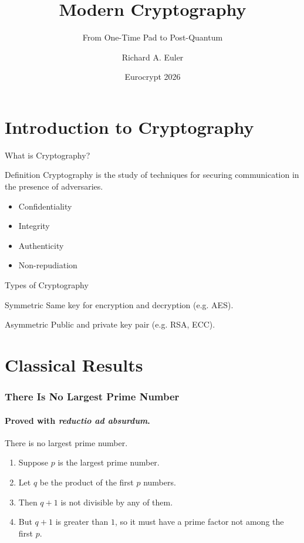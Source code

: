 \documentclass{beamer}
\title[Modern Cryptography]{Modern Cryptography}
\subtitle{From One-Time Pad to Post-Quantum}
\author[N. Surname]{Richard A. Euler}
\institute{Politecnico di Torino}
\date[EC26]{Eurocrypt 2026}
\begin{document}
\begin{frame}
  \titlepage
\end{frame}

\section{Introduction to Cryptography}

\begin{frame}{What is Cryptography?}
\begin{block}{Definition}
Cryptography is the study of techniques for securing communication in the presence of adversaries.
\end{block}

\begin{itemize}
\item<1-> Confidentiality
\item<2-> Integrity
\item<3-> Authenticity
\item<4-> Non-repudiation
\end{itemize}
\end{frame}

\begin{frame}{Types of Cryptography}
\begin{exampleblock}{Symmetric}
Same key for encryption and decryption (e.g. AES).
\end{exampleblock}

\begin{alertblock}{Asymmetric}
Public and private key pair (e.g. RSA, ECC).
\end{alertblock}
\end{frame}

\section{Classical Results}

\begin{frame}
\frametitle{There Is No Largest Prime Number}
\framesubtitle{Proved with \textit{reductio ad absurdum}.} 

\begin{theorem}
There is no largest prime number.
\end{theorem}

\begin{enumerate}
  \item<1-| alert@1> Suppose $p$ is the largest prime number.
  \item<2-> Let $q$ be the product of the first $p$ numbers.
  \item<3-> Then $q+1$ is not divisible by any of them.
  \item<4-> But $q + 1$ is greater than $1$, so it must have a prime factor not among the first $p$.
\end{enumerate}
\end{frame}
\end{document}
